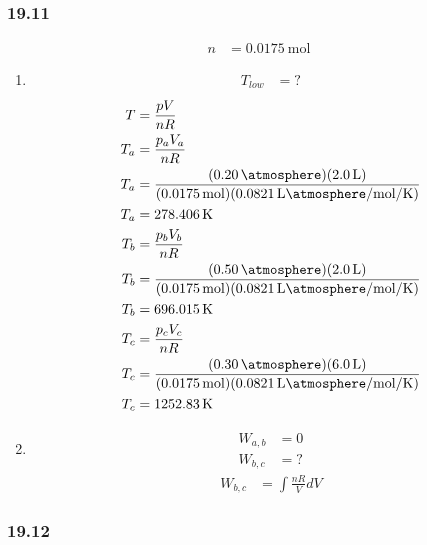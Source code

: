 \documentclass{article}
\begin{document}
\subsubsection{19.11}

\begin{align*}
	n & = \SI{0.0175}{\mole}
\end{align*}
\begin{enumerate}[label = \textbf{(\alph*)}]
	\item
		\begin{align*}
			T_{low} & = ?
		\end{align*}
		\begin{align*}
			T & = \frac{ pV }{ nR } \\
			T_a & = \frac{ p_aV_a }{ nR } \\
			T_a & = \frac{ (\SI{0.20}{\atmosphere})(\SI{2.0}{\liter}) }{ (\SI{0.0175}{\mole})(\SI{0.0821}{\liter \atmosphere \per \mole \per \kelvin}) } \\
			T_a & = \SI{278.406}{\kelvin} \\
			T_b & = \frac{ p_bV_b }{ nR } \\
			T_b & = \frac{ (\SI{0.50}{\atmosphere})(\SI{2.0}{\liter}) }{ (\SI{0.0175}{\mole})(\SI{0.0821}{\liter \atmosphere \per \mole \per \kelvin}) } \\
			T_b & = \SI{696.015}{\kelvin} \\
			T_c & = \frac{ p_cV_c }{ nR } \\
			T_c & = \frac{ (\SI{0.30}{\atmosphere})(\SI{6.0}{\liter}) }{ (\SI{0.0175}{\mole})(\SI{0.0821}{\liter \atmosphere \per \mole \per \kelvin}) } \\
			T_c & = \SI{1252.83}{\kelvin} \\
		\end{align*}
	\item
		\begin{align*}
			W_{a,b} & = 0 \\
			W_{b,c} & = ?
		\end{align*}
		\begin{align*}
			W_{b,c} & = \int \frac{ nR }{ V } dV
		\end{align*}
\end{enumerate}

\subsubsection{19.12}
\end{document}
